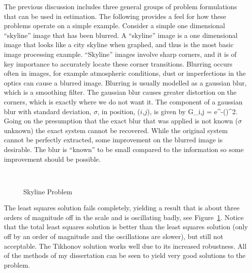 The previous discussion includes three general groups of problem formulations that can be used in estimation.  The following provides a feel for how these problems operate on a simple example.  Consider a simple one dimensional ``skyline'' image that has been blurred.  A ``skyline'' image is a one dimensional image that looks like a city skyline when graphed, and thus is the most basic image processing example.  ``Skyline'' images involve sharp corners, and it is of key importance to accurately locate these corner transitions.  Blurring occurs often in images, for example atmospheric conditions, dust or imperfections in the optics can cause a blurred image.  Blurring is usually modelled as a gaussian blur, which is a smoothing filter.  The gaussian blur causes greater distortion on the corners, which is exactly where we do not want it.  The component of a gaussian blur with standard deviation, $\sigma$, in position, ($i$,$j$), is given by
\beqn
G_{i,j} = e^{-\left(\right)^{2}}.
\eeqn
Going on the presumption that the exact blur that was applied is not known ($\sigma$ unknown) the exact system cannot be recovered.  While the original system cannot be perfectly extracted, some improvement on the blurred image is desirable.  The blur is ``known'' to be small compared to the information so some improvement should be possible.
\begin{figure}
\begin{center}
\leavevmode
\hbox{%
\epsfxsize=5.5in
}
\end{center}
\caption{Skyline Problem}
\label{skyline}
\end{figure}
The least squares solution fails completely, yielding a
result that is about three orders of magnitude off in the scale and is oscillating badly, see
Figure~\ref{skyline}.  Notice that the total least squares solution
is better than the least squares solution (only off by an order of magnitude and the oscillations are slower), but still not acceptable.  The
Tikhonov solution works well due to its increased robustness.  All of the methods of my dissertation can be seen to
yield very good solutions to the problem.




